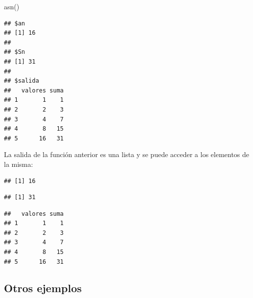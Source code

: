 \documentclass[
]{book}
\newenvironment{Shaded}{\begin{snugshade}}{\end{snugshade}}
\newcommand{\FunctionTok}[1]{\textcolor[rgb]{0.00,0.00,0.00}{#1}}
\newcommand{\NormalTok}[1]{#1}
\newcommand{\OtherTok}[1]{\textcolor[rgb]{0.56,0.35,0.01}{#1}}
\newcommand{\SpecialCharTok}[1]{\textcolor[rgb]{0.00,0.00,0.00}{#1}}
\theoremstyle{break}
\begin{document}
\begin{Shaded}
\begin{Highlighting}[]
\FunctionTok{asn}\NormalTok{()}
\end{Highlighting}
\end{Shaded}

\begin{verbatim}
## $an
## [1] 16
## 
## $Sn
## [1] 31
## 
## $salida
##   valores suma
## 1       1    1
## 2       2    3
## 3       4    7
## 4       8   15
## 5      16   31
\end{verbatim}

La salida de la función anterior es una lista y se puede
acceder a los elementos de la misma:

\begin{Shaded}
\end{Shaded}

\begin{verbatim}
## [1] 16
\end{verbatim}

\begin{Shaded}
\end{Shaded}

\begin{verbatim}
## [1] 31
\end{verbatim}

\begin{Shaded}
\end{Shaded}

\begin{verbatim}
##   valores suma
## 1       1    1
## 2       2    3
## 3       4    7
## 4       8   15
## 5      16   31
\end{verbatim}

\hypertarget{otros-ejemplos}{%
\subsection{Otros ejemplos}\label{otros-ejemplos}}
\end{document}
